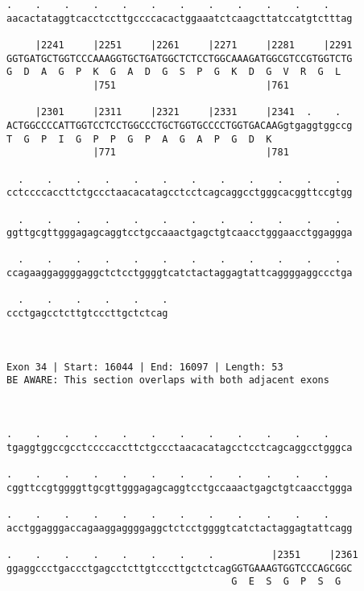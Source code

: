 \documentclass{article}
\begin{document}
\begin{Verbatim}
.    .    .    .    .    .    .    .    .    .    .    .    
aacactataggtcacctccttgccccacactggaaatctcaagcttatccatgtctttag
                                                            
     |2241     |2251     |2261     |2271     |2281     |2291
GGTGATGCTGGTCCCAAAGGTGCTGATGGCTCTCCTGGCAAAGATGGCGTCCGTGGTCTG
G  D  A  G  P  K  G  A  D  G  S  P  G  K  D  G  V  R  G  L  
               |751                          |761           
  
     |2301     |2311     |2321     |2331     |2341  .    .  
ACTGGCCCCATTGGTCCTCCTGGCCCTGCTGGTGCCCCTGGTGACAAGgtgaggtggccg
T  G  P  I  G  P  P  G  P  A  G  A  P  G  D  K              
               |771                          |781           
  
  .    .    .    .    .    .    .    .    .    .    .    .  
cctccccaccttctgccctaacacatagcctcctcagcaggcctgggcacggttccgtgg
                                                            
  .    .    .    .    .    .    .    .    .    .    .    .  
ggttgcgttgggagagcaggtcctgccaaactgagctgtcaacctgggaacctggaggga
                                                            
  .    .    .    .    .    .    .    .    .    .    .    .  
ccagaaggaggggaggctctcctggggtcatctactaggagtattcaggggaggccctga
                                                            
  .    .    .    .    .    .
ccctgagcctcttgtcccttgctctcag
                            
                            
 
Exon 34 | Start: 16044 | End: 16097 | Length: 53
BE AWARE: This section overlaps with both adjacent exons



.    .    .    .    .    .    .    .    .    .    .    .    
tgaggtggccgcctccccaccttctgccctaacacatagcctcctcagcaggcctgggca
                                                            
.    .    .    .    .    .    .    .    .    .    .    .    
cggttccgtggggttgcgttgggagagcaggtcctgccaaactgagctgtcaacctggga
                                                            
.    .    .    .    .    .    .    .    .    .    .    .    
acctggagggaccagaaggaggggaggctctcctggggtcatctactaggagtattcagg
                                                            
.    .    .    .    .    .    .    .          |2351     |2361
ggaggccctgaccctgagcctcttgtcccttgctctcagGGTGAAAGTGGTCCCAGCGGC
                                       G  E  S  G  P  S  G  
                                                            

\end{Verbatim}
\end{document}
